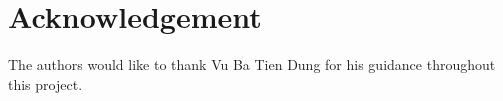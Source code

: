 \documentclass[conference,a4paper]{IEEEtran}
\begin{document}
\section*{Acknowledgement}
The authors would like to thank Vu Ba Tien Dung for his guidance throughout this project.




\nocite*{}


\end{document}

